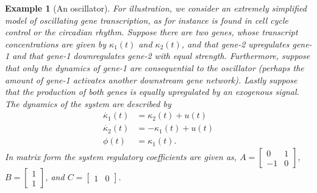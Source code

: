 \documentclass{article}
\newcommand{\1}{\mathbbm{1}}
\newtheorem{example}{Example}
\begin{document}
\begin{example}[An oscillator]\label{ex:oscillator}
For illustration, we consider an extremely simplified model of oscillating gene transcription,
as for instance is found in cell cycle control or the circadian rhythm.
Suppose there are two genes, 
whose transcript concentrations are given by $\kappa_1(t)$ and $\kappa_2(t)$, 
and that gene-2 upregulates gene-1 and that gene-1 downregulates gene-2 with equal strength.
Furthermore, suppose that only the dynamics of gene-1 are consequential to the oscillator 
(perhaps the amount of gene-1 activates another downstream gene network). 
Lastly suppose that the production of both genes is equally upregulated by an exogenous signal.
The dynamics of the system are described by
    \begin{align*}
      \dot{\kappa_{1}}(t) &= \kappa_{2}(t) + u(t) \\
        \dot{\kappa_{2}}(t) &= - \kappa_{1}(t) + u(t) \\
        \phi(t) &= \kappa_{1}(t)   .
    \end{align*}
In matrix form the system regulatory coefficients are given as,
$A \!=\! \left[\begin{smallmatrix} 0 & 1 \\ -1 & 0 \end{smallmatrix}\right]$, 
$B \! =\! \left[\begin{smallmatrix} 1 \\ 1 \end{smallmatrix}\right]$,
and $C \!=\! \left[\begin{smallmatrix} 1 & 0 \end{smallmatrix}\right]$.

\end{example}
\end{document}
